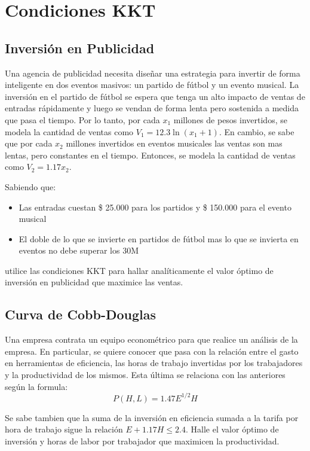 \documentclass[12pt]{article}
\begin{document}
\section*{Condiciones KKT}

\subsection{Inversión en Publicidad}

Una agencia de publicidad necesita diseñar una estrategia para invertir de forma inteligente en dos eventos masivos: un partido de fútbol y un evento musical. La inversión en el partido de fútbol se espera que tenga un alto impacto de ventas de entradas rápidamente y luego se vendan de forma lenta pero sostenida a medida que pasa el tiempo. Por lo tanto, por cada $x_1$ millones de pesos invertidos, se modela la cantidad de ventas como $V_1 = 12.3 \ln (x_1+1)$. En cambio, se sabe que por cada $x_2$ millones invertidos en eventos musicales las ventas son mas lentas, pero constantes en el tiempo. Entonces, se modela la cantidad de ventas como $V_2 = 1.17 x_2$.
 
Sabiendo que:
\begin{itemize}
    \item Las entradas cuestan \$ 25.000 para los partidos y \$ 150.000 para el evento musical
    \item El doble de lo que se invierte en partidos de fútbol mas lo que se invierta en eventos no debe superar los 30M
\end{itemize}
utilice las condiciones KKT para hallar analíticamente el valor óptimo de inversión en publicidad que maximice las ventas.

\subsection{Curva de Cobb-Douglas}

Una empresa contrata un equipo econométrico para que realice un análisis de la empresa. En particular, se quiere conocer que pasa con la relación entre el gasto en herramientas de eficiencia, las horas de trabajo invertidas por los trabajadores  y la productividad de los mismos. Esta última se relaciona con las anteriores según la formula:
\begin{equation*}
    P(H,L) = 1.47  E^{1/2} H
\end{equation*}

Se sabe tambien que la suma de la inversión en eficiencia sumada a la tarifa por hora de trabajo sigue la relación $E + 1.17 H \leq 2.4$. Halle el valor óptimo de inversión y horas de labor por trabajador que maximicen la productividad.
\end{document}
